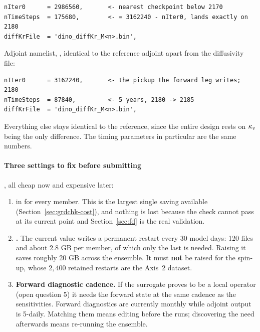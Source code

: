 \begin{footnotesize}
\begin{verbatim}
nIter0      = 2986560,       <- nearest checkpoint below 2170
nTimeSteps  = 175680,        <- = 3162240 - nIter0, lands exactly on 2180
diffKrFile  = 'dino_diffKr_M<n>.bin',
\end{verbatim}
\end{footnotesize}

Adjoint namelist, ,
identical to the reference adjoint apart from the diffusivity file:

\begin{footnotesize}
\begin{verbatim}
nIter0      = 3162240,       <- the pickup the forward leg writes; 2180
nTimeSteps  = 87840,         <- 5 years, 2180 -> 2185
diffKrFile  = 'dino_diffKr_M<n>.bin',
\end{verbatim}
\end{footnotesize}

Everything else stays identical to the reference, since the entire design rests
on $\kappa_{v}$ being the only difference. The timing parameters in particular are the
same numbers.

\paragraph{Three settings to fix before submitting}, all cheap now and expensive
later:

\begin{enumerate}
  \item \textbf{} in  for every member.
        This is the largest single saving available
        (Section~\ref{sec:grdchk-cost}), and nothing is lost because the check
        cannot pass at its current point and Section~\ref{sec:fd} is the real
        validation.
  \item \textbf{.} The current value writes a permanent restart
        every 30 model days: 120 files and about 2.8 GB per member, of which only
        the last is needed. Raising it saves roughly 20 GB across the ensemble.
        It must \textbf{not} be raised for the spin-up, whose $2{,}400$ retained
        restarts are the Axis~2 dataset.
  \item \textbf{Forward diagnostic cadence.} If the surrogate proves to be a
        local operator (open question 5) it needs the forward state at the same
        cadence as the sensitivities. Forward diagnostics are currently monthly
        while adjoint output is 5-daily. Matching them means editing
         before the runs; discovering the need afterwards
        means re-running the ensemble.
\end{enumerate}

